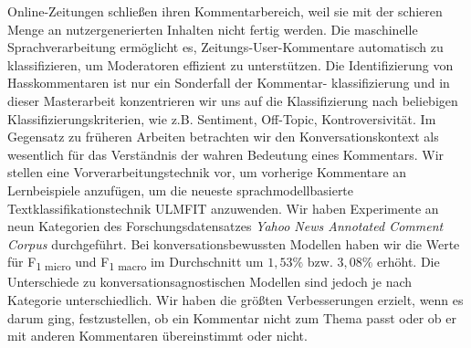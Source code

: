 Online-Zeitungen schlie{\ss}en ihren Kommentarbereich, weil sie mit der schieren Menge an nutzergenerierten Inhalten nicht fertig werden.
Die maschinelle Sprachverarbeitung erm{\"o}glicht es, Zeitungs-User-Kommentare automatisch zu klassifizieren, um Moderatoren effizient zu unterst{\"u}tzen.
Die Identifizierung von Hasskommentaren ist nur ein Sonderfall der Kommentar- klassifizierung und in dieser Masterarbeit konzentrieren wir uns auf die Klassifizierung nach beliebigen Klassifizierungskriterien, wie z.B. Sentiment, Off-Topic, Kontroversivit{\"a}t.
Im Gegensatz zu fr{\"u}heren Arbeiten betrachten wir den Konversationskontext als wesentlich f{\"u}r das Verst{\"a}ndnis der wahren Bedeutung eines Kommentars.
Wir stellen eine Vorverarbeitungstechnik vor, um vorherige Kommentare an Lernbeispiele anzuf{\"u}gen, um die neueste sprachmodellbasierte Textklassifikationstechnik ULMFIT anzuwenden.
Wir haben Experimente an neun Kategorien des Forschungsdatensatzes \textit{Yahoo News Annotated Comment Corpus} durchgef{\"u}hrt.
Bei konversationsbewussten Modellen haben wir die Werte f{\"u}r F\textsubscript{1 micro} und F\textsubscript{1 macro} im Durchschnitt um $1,53\%$ bzw. $3,08\%$ erh{\"o}ht.
Die Unterschiede zu konversationsagnostischen Modellen sind jedoch je nach Kategorie unterschiedlich.
Wir haben die gr{\"o}{\ss}ten Verbesserungen erzielt, wenn es darum ging, festzustellen, ob ein Kommentar nicht zum Thema passt oder ob er mit anderen Kommentaren {\"u}bereinstimmt oder nicht.